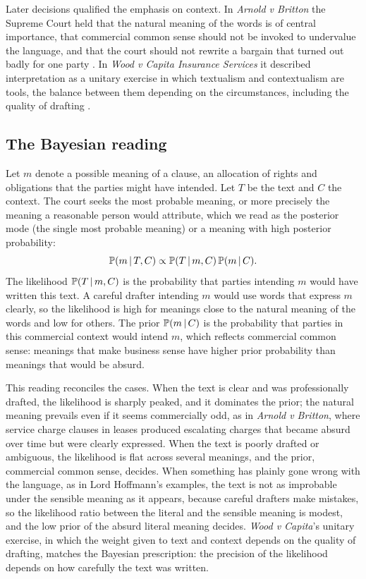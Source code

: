Later decisions qualified the emphasis on context. In \emph{Arnold v Britton} the Supreme Court held that the natural meaning of the words is of central importance, that commercial common sense should not be invoked to undervalue the language, and that the court should not rewrite a bargain that turned out badly for one party \citep{arnold2015}. In \emph{Wood v Capita Insurance Services} it described interpretation as a unitary exercise in which textualism and contextualism are tools, the balance between them depending on the circumstances, including the quality of drafting \citep{wood2017}.

\subsection{The Bayesian reading}

Let $m$ denote a possible meaning of a clause, an allocation of rights and obligations that the parties might have intended. Let $T$ be the text and $C$ the context. The court seeks the most probable meaning, or more precisely the meaning a reasonable person would attribute, which we read as the posterior mode (the single most probable meaning) or a meaning with high posterior probability:
\begin{equation}
\mathbb{P}(m\,\vert\, T, C) \propto \mathbb{P}(T\,\vert\, m, C)\,\mathbb{P}(m\,\vert\, C).
\end{equation}
The likelihood $\mathbb{P}(T\,\vert\, m, C)$ is the probability that parties intending $m$ would have written this text. A careful drafter intending $m$ would use words that express $m$ clearly, so the likelihood is high for meanings close to the natural meaning of the words and low for others. The prior $\mathbb{P}(m\,\vert\, C)$ is the probability that parties in this commercial context would intend $m$, which reflects commercial common sense: meanings that make business sense have higher prior probability than meanings that would be absurd.

This reading reconciles the cases. When the text is clear and was professionally drafted, the likelihood is sharply peaked, and it dominates the prior; the natural meaning prevails even if it seems commercially odd, as in \emph{Arnold v Britton}, where service charge clauses in leases produced escalating charges that became absurd over time but were clearly expressed. When the text is poorly drafted or ambiguous, the likelihood is flat across several meanings, and the prior, commercial common sense, decides. When something has plainly gone wrong with the language, as in Lord Hoffmann's examples, the text is not as improbable under the sensible meaning as it appears, because careful drafters make mistakes, so the likelihood ratio between the literal and the sensible meaning is modest, and the low prior of the absurd literal meaning decides. \emph{Wood v Capita}'s unitary exercise, in which the weight given to text and context depends on the quality of drafting, matches the Bayesian prescription: the precision of the likelihood depends on how carefully the text was written.

